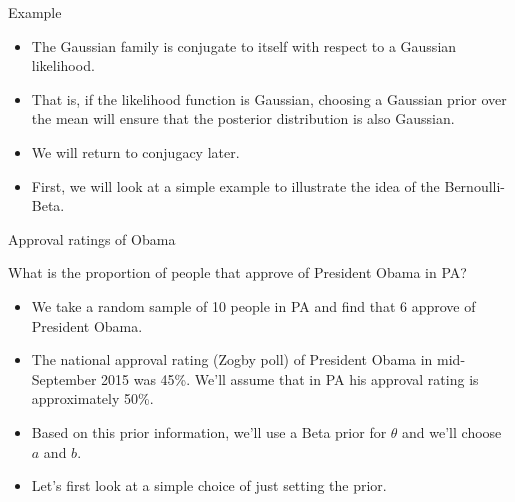 \documentclass[
  ignorenonframetext,
]{beamer}
\providecommand{\tightlist}{%
  \setlength{\itemsep}{0pt}\setlength{\parskip}{0pt}}
\begin{document}
\begin{frame}{Example}
\protect\hypertarget{example}{}

\begin{itemize}
\item
  The Gaussian family is conjugate to itself with respect to a Gaussian
  likelihood.
\item
  That is, if the likelihood function is Gaussian, choosing a Gaussian
  prior over the mean will ensure that the posterior distribution is
  also Gaussian.
\item
  We will return to conjugacy later.
\item
  First, we will look at a simple example to illustrate the idea of the
  Bernoulli-Beta.
\end{itemize}

\end{frame}

\begin{frame}{Approval ratings of Obama}
\protect\hypertarget{approval-ratings-of-obama}{}

What is the proportion of people that approve of President Obama in PA?

\begin{itemize}
\tightlist
\item
  We take a random sample of 10 people in PA and find that 6 approve of
  President Obama.
\item
  The national approval rating (Zogby poll) of President Obama in
  mid-September 2015 was 45\%. We'll assume that in PA his approval
  rating is approximately 50\%.
\item
  Based on this prior information, we'll use a Beta prior for \(\theta\)
  and we'll choose \(a\) and \(b.\)
\item
  Let's first look at a simple choice of just setting the prior.
\end{itemize}

\end{frame}
\end{document}
